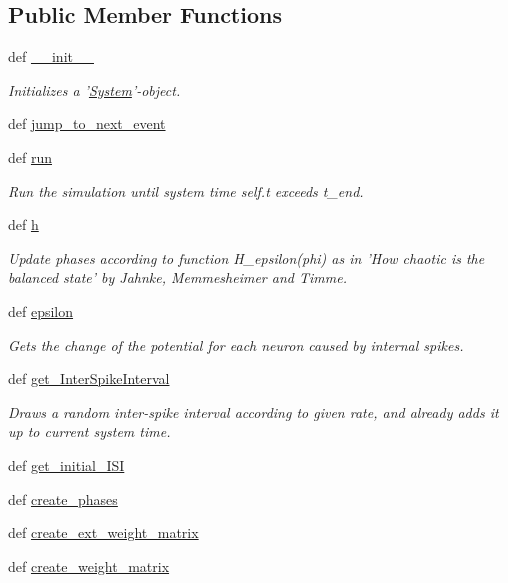 \subsection*{Public Member Functions}
\begin{DoxyCompactItemize}
\item 
def \hyperlink{classsystem_1_1System_ab84763a8a2fcb9acb23ac66607f426ec}{\-\_\-\-\_\-init\-\_\-\-\_\-}
\begin{DoxyCompactList}\small\item\em Initializes a '\hyperlink{classsystem_1_1System}{System}'-\/object. \end{DoxyCompactList}\item 
def \hyperlink{classsystem_1_1System_a9ec2f5b1ad6c228001c7f95cc47446a8}{jump\-\_\-to\-\_\-next\-\_\-event}
\item 
def \hyperlink{classsystem_1_1System_a41d4bfe3fd30910f8d92b5bf182d862e}{run}
\begin{DoxyCompactList}\small\item\em Run the simulation until system time self.\-t exceeds t\-\_\-end. \end{DoxyCompactList}\item 
def \hyperlink{classsystem_1_1System_ad02e76750219966d321e5617e7408e28}{h}
\begin{DoxyCompactList}\small\item\em Update phases according to function H\-\_\-epsilon(phi) as in 'How chaotic is the balanced state' by Jahnke, Memmesheimer and Timme. \end{DoxyCompactList}\item 
def \hyperlink{classsystem_1_1System_a5d42184d0107e6c6777ebde19ff2aa8c}{epsilon}
\begin{DoxyCompactList}\small\item\em Gets the change of the potential for each neuron caused by internal spikes. \end{DoxyCompactList}\item 
def \hyperlink{classsystem_1_1System_a13682705bf8c3b30abb55ee89fe47e96}{get\-\_\-\-Inter\-Spike\-Interval}
\begin{DoxyCompactList}\small\item\em Draws a random inter-\/spike interval according to given rate, and already adds it up to current system time. \end{DoxyCompactList}\item 
def \hyperlink{classsystem_1_1System_aa50493e5779fb6d1e3432be1e2f65605}{get\-\_\-initial\-\_\-\-I\-S\-I}
\item 
def \hyperlink{classsystem_1_1System_a91032897c3c698801333653415cc1c73}{create\-\_\-phases}
\item 
def \hyperlink{classsystem_1_1System_aed8b22289b24b4c09dcf34911f4645b5}{create\-\_\-ext\-\_\-weight\-\_\-matrix}
\item 
def \hyperlink{classsystem_1_1System_a3b3aaa44cf6a8a579e94c7902bbb6473}{create\-\_\-weight\-\_\-matrix}
\end{DoxyCompactItemize}
